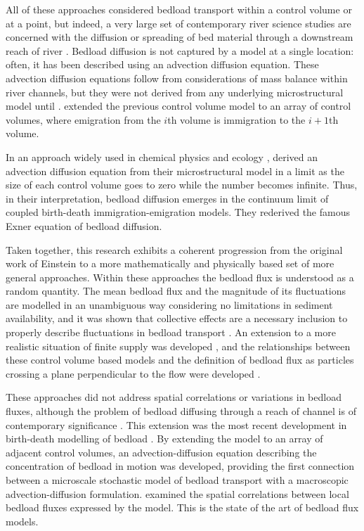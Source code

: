 All of these approaches considered bedload transport within a control volume or at a point, but indeed, a very large set of contemporary river science studies are concerned with the diffusion or spreading of bed material through a downstream reach of river \citep{Hassan2016}. 
Bedload diffusion is not captured by a model at a single location: often, it has been described using an advection diffusion equation. 
These advection diffusion equations follow from considerations of mass balance within river channels, but they were not derived from any underlying microstructural model until \citep{Ancey2014}. 
\citet{Ancey2014} extended the previous control volume model \citep{Ancey2008} to an array of control volumes, where emigration from the $i$th volume is immigration to the $i+1$th volume. 

In an approach widely used in chemical physics \citep{Gardiner1983} and ecology \citep{Bailey1968}, \citet{Ancey2015, Ancey2015} derived an advection diffusion equation from their microstructural model in a limit as the size of each control volume goes to zero while the number becomes infinite. 
Thus, in their interpretation, bedload diffusion emerges in the continuum limit of coupled birth-death immigration-emigration models. 
They rederived the famous Exner equation of bedload diffusion. 

Taken together, this research exhibits a coherent progression from the original work of Einstein to a more mathematically and physically based set of more general approaches. 
Within these approaches the bedload flux is understood as a random quantity. 
The mean bedload flux and the magnitude of its fluctuations are modelled in an unambiguous way \citep{Ancey2006, Ancey2008} considering no limitations in sediment availability, and it was shown that collective effects are a necessary inclusion to properly describe fluctuations in bedload transport \citep{Ancey2008}. 
An extension to a more realistic situation of finite supply was developed \citep{Turowski2009}, and the relationships between these control volume based models and the definition of bedload flux as particles crossing a plane perpendicular to the flow were developed \citep{Heyman2013, Ma2014b, Ballio2014}. 

These approaches did not address spatial correlations or variations in bedload fluxes, although the problem of bedload diffusing through a reach of channel is of contemporary significance \citep{Hassan2016}. 
This extension was the most recent development in birth-death modelling of bedload \citep{Ancey2014, Ancey2015}. 
By extending the \citet{Ancey2008} model to an array of adjacent control volumes, an advection-diffusion equation describing the concentration of bedload in motion was developed, providing the first connection between a microscale stochastic model of bedload transport with a macroscopic advection-diffusion formulation. 
\citet{Heyman2014} examined the spatial correlations between local bedload fluxes expressed by the \citet{Ancey2014} model. 
This is the state of the art of bedload flux models. 

